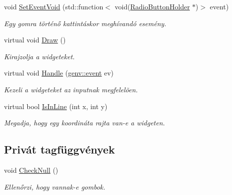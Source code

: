 \begin{DoxyCompactItemize}
void \hyperlink{class_radio_button_holder_a1b15e73021c8e2022d43b12f4246182d}{Set\+Event\+Void} (std\+::function$<$ void(\hyperlink{class_radio_button_holder}{Radio\+Button\+Holder} $\ast$)$>$ event)
\begin{DoxyCompactList}\small\item\em Egy gomra történő kattintáskor meghívandó esemény. \end{DoxyCompactList}\item 
virtual void \hyperlink{class_radio_button_holder_a70d6ba1724bdb68afe351d0474cbd767}{Draw} ()
\begin{DoxyCompactList}\small\item\em Kirajzolja a widgeteket. \end{DoxyCompactList}\item 
virtual void \hyperlink{class_radio_button_holder_a7b4ed9e75eef252ad20c3cbcb8547981}{Handle} (\hyperlink{structgenv_1_1event}{genv\+::event} ev)
\begin{DoxyCompactList}\small\item\em Kezeli a widgeteket az inputnak megfelelõen. \end{DoxyCompactList}\item 
virtual bool \hyperlink{class_radio_button_holder_aa6d6fe7d9eb9ce9c2628f432ef129e01}{Is\+In\+Line} (int x, int y)
\begin{DoxyCompactList}\small\item\em Megadja, hogy egy koordináta rajta van-\/e a widgeten. \end{DoxyCompactList}\end{DoxyCompactItemize}
\subsection*{Privát tagfüggvények}
\begin{DoxyCompactItemize}
\item 
void \hyperlink{class_radio_button_holder_aeca94b584cd2a969f38f587f08ff43df}{Check\+Null} ()
\begin{DoxyCompactList}\small\item\em Ellenőrzi, hogy vannak-\/e gombok. \end{DoxyCompactList}\end{DoxyCompactItemize}
